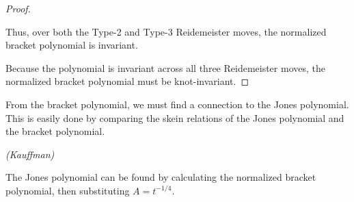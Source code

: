 \documentclass[12pt]{article}
\newenvironment{theorem}[2][Theorem]{\begin{trivlist}
\item[\hskip \labelsep {\bfseries #1}\hskip \labelsep {\bfseries #2.}]}{\end{trivlist}}
\begin{document}
\begin{proof}
\begin{itemize}
Thus, over both the Type-2 and Type-3 Reidemeister moves, the normalized bracket polynomial is invariant. 


\end{itemize}

Because the polynomial is invariant across all three Reidemeister moves, the normalized bracket polynomial must be knot-invariant. 

\end{proof}

From the bracket polynomial, we must find a connection to the Jones polynomial. This is easily done by comparing the skein relations of the Jones polynomial and the bracket polynomial. 

\begin{theorem}{3.2}{\textit{(Kauffman)}} 

The Jones polynomial can be found by calculating the normalized bracket polynomial, then substituting $A = t^{-1/4}$. 

\end{theorem}
\end{document}
